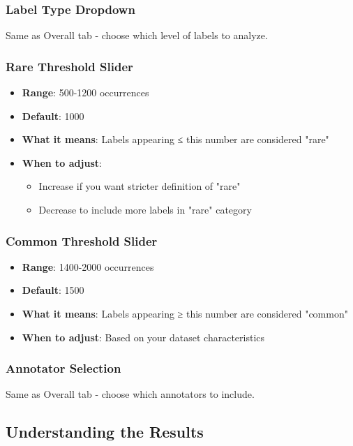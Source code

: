 \documentclass[11pt]{article}
\begin{document}
\subsubsection{Label Type Dropdown}
Same as Overall tab - choose which level of labels to analyze.

\subsubsection{Rare Threshold Slider}
\begin{itemize}
\item \textbf{Range}: 500-1200 occurrences
\item \textbf{Default}: 1000
\item \textbf{What it means}: Labels appearing ≤ this number are considered "rare"
\item \textbf{When to adjust}: 
\begin{itemize}
\item Increase if you want stricter definition of "rare"
\item Decrease to include more labels in "rare" category
\end{itemize}
\end{itemize}

\subsubsection{Common Threshold Slider}
\begin{itemize}
\item \textbf{Range}: 1400-2000 occurrences
\item \textbf{Default}: 1500
\item \textbf{What it means}: Labels appearing ≥ this number are considered "common"
\item \textbf{When to adjust}: Based on your dataset characteristics
\end{itemize}

\subsubsection{Annotator Selection}
Same as Overall tab - choose which annotators to include.

\subsection{Understanding the Results}
\end{document}
